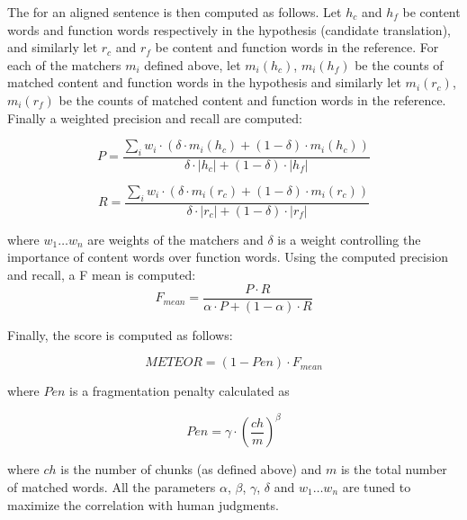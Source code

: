 The  for an aligned sentence is then computed as follows. Let
$h_c$ and $h_f$ be content words and function words respectively in the
hypothesis (candidate translation), and similarly let $r_c$ and $r_f$ be
content and function words in the reference. For each of the matchers $m_i$
defined above, let $m_i(h_c)$, $m_i(h_f)$ be the counts of matched content and
function words in the hypothesis and similarly let $m_i(r_c)$, $m_i(r_f)$ be
the counts of matched content and function words in the reference. Finally
a weighted precision and recall are computed:

\begin{equation*}
    P = \frac{
        \sum_i w_i \cdot ( \delta \cdot m_i(h_c) + (1-\delta) \cdot m_i(h_c))
    }{
        \delta \cdot |h_c| + (1-\delta) \cdot |h_f|
    }
\end{equation*}

\begin{equation*}
    R = \frac{
        \sum_i w_i \cdot ( \delta \cdot m_i(r_c) + (1-\delta) \cdot m_i(r_c))
    }{
        \delta \cdot |r_c| + (1-\delta) \cdot |r_f|
    }
\end{equation*}

\noindent where $w_1 \ldots w_n$ are weights of the matchers and $\delta$ is a weight
controlling the importance of content words over function words.
Using the computed precision and recall, a F mean is computed:
\begin{equation*}
    F_{mean} = \frac{
        P \cdot R
    }{
        \alpha \cdot P + (1 - \alpha) \cdot R
    }
\end{equation*}

\noindent Finally, the  score is computed as follows:

\begin{equation*}
    METEOR = (1-Pen)\cdot F_{mean}
\end{equation*}

\noindent where $Pen$ is a fragmentation penalty calculated as 

\begin{equation*}
    Pen = \gamma \cdot \left( \frac{ch}{m} \right)^\beta
\end{equation*}

\noindent where $ch$ is the number of chunks (as defined above) and $m$ is the
total number of matched words. All the parameters $\alpha$, $\beta$, $\gamma$,
$\delta$ and $w_1 \ldots w_n$ are tuned to maximize the correlation with human
judgments.

